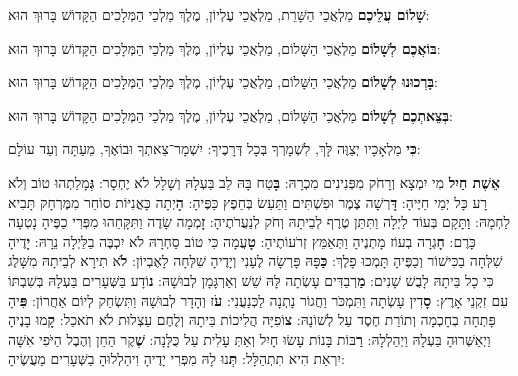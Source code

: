 

\textbf{שָׁלוֹם עֲלֵיכֶם} מַלְאֲכֵי הַשָּׁרֵת, מַלְאֲכֵי עֶלְיוֹן, מֶלֶךְ מַלְכֵי הַמְּלָכִים הַקָּדוֹשׁ בָּרוּךְ הוּא:

\textbf{בּוֹאֲכֶם לְשָׁלוֹם} מַלְאֲכֵי הַשָּׁלוֹם, מַלְאֲכֵי עֶלְיוֹן, מֶלֶךְ מַלְכֵי הַמְּלָכִים הַקָּדוֹשׁ בָּרוּךְ הוּא:

\textbf{בָּרְכוּנוּ לְשָׁלוֹם} מַלְאֲכֵי הַשָּׁלוֹם, מַלְאֲכֵי עֶלְיוֹן, מֶלֶךְ מַלְכֵי הַמְּלָכִים הַקָּדוֹשׁ בָּרוּךְ הוּא:

\textbf{בְּצֵאתְכֶם לְשָׁלוֹם} מַלְאֲכֵי הַשָּׁלוֹם, מַלְאֲכֵי עֶלְיוֹן, מֶלֶךְ מַלְכֵי הַמְּלָכִים הַקָּדוֹשׁ בָּרוּךְ הוּא:

\textbf{כִּי} מַלְאָכָיו יְצַוֶּה לָּךְ, לִשְׁמָרְךָ בְּכָל דְּרָכֶיךָ: \Shem{} יִשְׁמָר־צֵאתְךָ וּבוֹאֶךָ, מֵעַתָּה וְעַד עוֹלָם:

\divider


\textbf{אֵשֶׁת חַיִל} מִי יִמְצָא וְרָחֹק מִפְּנִינִים מִכְרָהּ: \textbf{בָּ}טַח בָּהּ לֵב בַּעְלָהּ וְשָׁלָל לֹא יֶחְסָר: \textbf{גְּ}מָלַתְהוּ טוֹב וְלֹא רָע כָּל יְמֵי חַיֶּיהָ: \textbf{דָּ}רְשָׁה צֶמֶר וּפִשְׁתִּים וַתַּעַשׂ בְּחֵפֶץ כַּפֶּיהָ: \textbf{הָ}יְתָה כָּאֳנִיּוֹת סוֹחֵר מִמֶּרְחָק תָּבִיא לַחְמָהּ: \textbf{וַ}תָּקָם בְּעוֹד לַיְלָה וַתִּתֵּן טֶרֶף לְבֵיתָהּ וְחֹק לְנַעֲרֹתֶיהָ: \textbf{זָ}מְמָה שָׂדֶה וַתִּקָּחֵהוּ מִפְּרִי כַפֶּיהָ נָטְעָה כָּרֶם: \textbf{חָ}גְרָה בְעוֹז מָתְנֶיהָ וַתְּאַמֵּץ זְרֹעוֹתֶיהָ: \textbf{טָ}עֲמָה כִּי טוֹב סַחְרָהּ לֹא יִכְבֶּה בַלַּיְלָה נֵרָהּ: \textbf{יָ}דֶיהָ שִׁלְּחָה בַכִּישׁוֹר וְכַפֶּיהָ תָּמְכוּ פָלֶךְ: \textbf{כַּ}פָּהּ פָּרְשָׂה לֶעָנִי וְיָדֶיהָ שִׁלְּחָה לָאֶבְיוֹן: \textbf{לֹ}א תִירָא לְבֵיתָהּ מִשָּׁלֶג כִּי כָל בֵּיתָהּ לָבֻשׁ שָׁנִים: \textbf{מַ}רְבַדִּים עָשְׂתָה לָּהּ שֵׁשׁ וְאַרְגָּמָן לְבוּשָׁהּ: \textbf{נ}וֹדָע בַּשְּׁעָרִים בַּעְלָהּ בְּשִׁבְתּוֹ עִם זִקְנֵי אָרֶץ: \textbf{סָ}דִין עָשְׂתָה וַתִּמְכֹּר וַחֲגוֹר נָתְנָה לַכְּנַעֲנִי: \textbf{עֹ}ז וְהָדָר לְבוּשָׁהּ וַתִּשְׂחַק לְיוֹם אַחֲרוֹן: \textbf{פִּ}יהָ פָּתְחָה בְחָכְמָה וְתוֹרַת חֶסֶד עַל לְשׁוֹנָהּ: \textbf{צ}וֹפִיָּה הֲלִיכוֹת בֵּיתָהּ וְלֶחֶם עַצְלוּת לֹא תֹאכֵל: \textbf{קָ}מוּ בָנֶיהָ וַיְאַשְּׁרוּהָ בַּעְלָהּ וַיְהַלְלָהּ: \textbf{רַ}בּוֹת בָּנוֹת עָשׂוּ חָיִל וְאַתְּ עָלִית עַל כֻּלָּנָה: \textbf{שֶׁ}קֶר הַחֵן וְהֶבֶל הַיֹּפִי אִשָּׁה יִרְאַת \Shem{} הִיא תִתְהַלָּל: \textbf{תְּ}נוּ לָהּ מִפְּרִי יָדֶיהָ וִיהַלְלוּהָ בַשְּׁעָרִים מַעֲשֶׂיהָ:

